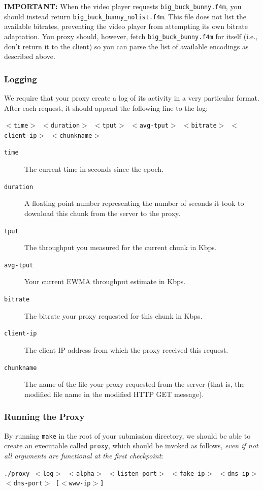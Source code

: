 \documentclass{article}
\begin{document}
\medskip \noindent \textbf{IMPORTANT:} When the video player requests
\texttt{big\_buck\_bunny.f4m}, you should instead return
\texttt{big\_buck\_bunny\_nolist.f4m}. This file does not list the available
bitrates, preventing the video player from attempting its own bitrate
adaptation. You proxy should, however, fetch \texttt{big\_buck\_bunny.f4m} for
itself (i.e., don't return it to the client) so you can parse the list of
available encodings as described above.


\subsubsection{Logging}
\label{sec:proxy-logging}

We require that your proxy create a log of its activity in a very particular
format. After each request, it should append the following line to the log:
\begin{center}
	\texttt{$<$time$>$ $<$duration$>$ $<$tput$>$ $<$avg-tput$>$ $<$bitrate$>$ $<$client-ip$>$ $<$chunkname$>$}
\end{center}

\begin{description}
	\item[\texttt{time}] The current time in seconds since the epoch.
	\item[\texttt{duration}] A floating point number representing the number of
	seconds it took to download this chunk from the server to the proxy.
	\item[\texttt{tput}] The throughput you measured for the current chunk in
	Kbps.
	\item[\texttt{avg-tput}] Your current EWMA throughput estimate in Kbps.
	\item[\texttt{bitrate}] The bitrate your proxy requested for this chunk in
	Kbps.
	\item[\texttt{client-ip}] The client IP address from which the proxy
	received this request.
	\item[\texttt{chunkname}] The name of the file your proxy requested from
	the server (that is, the modified file name in the modified HTTP GET
	message).
\end{description}


\subsubsection{Running the Proxy}
\label{sec:running-proxy}

By running \texttt{make} in the root of your submission directory, we should be
able to create an executable called \texttt{proxy}, which should be invoked as
follows, \emph{even if not all arguments are functional at the first checkpoint}:
\begin{center}
	\texttt{./proxy $<$log$>$ $<$alpha$>$ $<$listen-port$>$ $<$fake-ip$>$ $<$dns-ip$>$ $<$dns-port$>$ [$<$www-ip$>$]}
\end{center}
\end{document}
